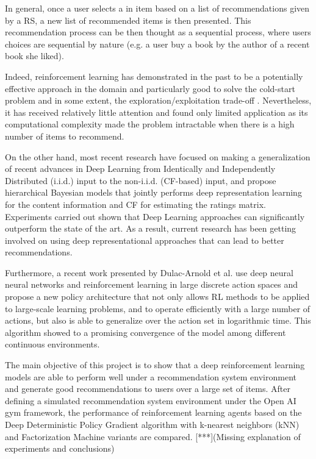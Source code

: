In general, once a user selects a in item based on a list of recommendations given by a RS, a new list of recommended items is then presented. This recommendation process can be then thought as a sequential process, where users choices are sequential by nature (e.g. a user buy a book by the author of a recent book she liked).

Indeed, reinforcement learning has demonstrated in the past to be a potentially effective approach in the domain and particularly good to solve the cold-start problem and in some extent, the exploration/exploitation trade-off \cite{shani2005mdp}. Nevertheless, it has received relatively little attention and found only limited application as its computational complexity made the problem intractable when there is a high number of items to recommend.

On the other hand, most recent research \cite{wang2015collaborative} have focused on making a generalization of recent advances in Deep Learning \cite{bengio2013representation} from Identically and Independently Distributed (i.i.d.) input to the non-i.i.d. (CF-based) input, and propose hierarchical Bayesian models that jointly performs deep representation learning for the content information and CF for estimating the ratings matrix. Experiments carried out shown that Deep Learning approaches can significantly outperform the state of the art. As a result, current research has been getting involved on using deep representational approaches that can lead to better recommendations.

Furthermore, a recent work presented by Dulac-Arnold et al. \cite{Dulac-Arnold2015} use deep neural neural networks and reinforcement learning in large discrete action spaces  and propose a new policy architecture that not only allows RL methods to be applied to large-scale learning problems, and to operate efficiently with a large number of actions, but also is able to generalize over the action set in logarithmic time. This algorithm showed to a promising convergence of the model among different continuous environments.

The main objective of this project is to show that a deep reinforcement learning models are able to perform well under a recommendation system environment and generate good recommendations to users over a large set of items. After defining a simulated recommendation system environment under the Open AI gym framework, the performance of reinforcement learning agents based on the Deep Deterministic Policy Gradient algorithm with k-nearest neighbors (kNN) and Factorization Machine variants are compared. [***](Missing explanation of experiments and conclusions)

